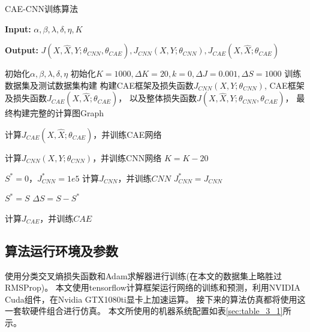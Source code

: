 \begin{algorithm}[ht]
	\caption{CAE-CNN训练算法}
	\hspace*{0.02in} {\bf Input:}
	$\alpha, \beta, \lambda, \delta, \eta, K$
	
	\hspace*{0.02in} {\bf Output:}
	$J(X, \hat{X}, Y; \theta_{CNN}, \theta_{CAE}), 
	J_{CNN}(X, Y; \theta_{CNN}) ,
	J_{CAE}(X, \hat{X}; \theta_{CAE})$
	
	\label{alg:CAE_CNN}

	\begin{algorithmic}[1]
		\REQUIRE 初始化$\alpha, \beta, \lambda, \delta, \eta$
		\REQUIRE 初始化$K=1000, \Delta K=20, k=0, \Delta J=0.001, \Delta S=1000$
		\REQUIRE 训练数据集及测试数据集构建
		\REQUIRE 构建CAE框架及损失函数$J_{CNN}(X, Y; \theta_{CNN})$, 
		CAE框架及损失函数$J_{CAE}(X, \hat{X}; \theta_{CAE})$，
		以及整体损失函数$J(X, \hat{X}, Y; \theta_{CNN}, \theta_{CAE})$，
		最终构建完整的计算图Graph
		
				\STATE 计算$J_{CAE}(X, \hat{X}; \theta_{CAE})$，并训练CAE网络
			\ENDFOR
			
				\STATE 计算$J_{CNN}(X, Y; \theta_{CNN})$，并训练CNN网络
			\ENDFOR
			\STATE $K = K - 20$
		\ENDWHILE
		
		\STATE $S^* = 0$，$J_{CNN}^*=1e5$ 
			\STATE 计算$J_{CNN}$，并训练$CNN$
				\STATE $J_{CNN}^* = J_{CNN}$
				
				\STATE $S^* = S$
			\ELSE
				\STATE $\Delta S = S - S^* $
			\ENDIF
			
				 \STATE 计算$J_{CAE}$，并训练$CAE$
			\ENDIF
		\ENDFOR
	\end{algorithmic}
\end{algorithm}


\subsection{算法运行环境及参数}
使用分类交叉熵损失函数和Adam求解器进行训练(在本文的数据集上略胜过RMSProp)。
本文使用tensorflow计算框架运行网络的训练和预测，利用NVIDIA Cuda组件，在Nvidia GTX1080ti显卡上加速运算。
接下来的算法仿真都将使用这一套软硬件组合进行仿真。
本文所使用的机器系统配置如表\ref{sec:table_3_1}所示。\par


